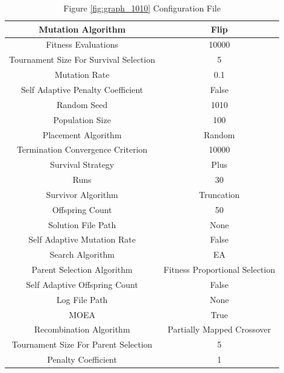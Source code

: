 \documentclass{standalone}
\begin{document}
\begin{table}[!htb]
	\centering
	\caption{Figure \ref{fig:graph_1010} Configuration File}
	\label{tab:graph_1010}
	\begin{tabular}{| c | c |}
		\hline
		Mutation Algorithm		& Flip		 \\
		\hline
		Fitness Evaluations		& 10000		 \\
		\hline
		Tournament Size For Survival Selection		& 5		 \\
		\hline
		Mutation Rate		& 0.1		 \\
		\hline
		Self Adaptive Penalty Coefficient		& False		 \\
		\hline
		Random Seed		& 1010		 \\
		\hline
		Population Size		& 100		 \\
		\hline
		Placement Algorithm		& Random		 \\
		\hline
		Termination Convergence Criterion		& 10000		 \\
		\hline
		Survival Strategy		& Plus		 \\
		\hline
		Runs		& 30		 \\
		\hline
		Survivor Algorithm		& Truncation		 \\
		\hline
		Offspring Count		& 50		 \\
		\hline
		Solution File Path		& None		 \\
		\hline
		Self Adaptive Mutation Rate		& False		 \\
		\hline
		Search Algorithm		& EA		 \\
		\hline
		Parent Selection Algorithm		& Fitness Proportional Selection		 \\
		\hline
		Self Adaptive Offspring Count		& False		 \\
		\hline
		Log File Path		& None		 \\
		\hline
		MOEA		& True		 \\
		\hline
		Recombination Algorithm		& Partially Mapped Crossover		 \\
		\hline
		Tournament Size For Parent Selection		& 5		 \\
		\hline
		Penalty Coefficient		& 1		 \\
		\hline
	\end{tabular}
\end{table}
\end{document}
